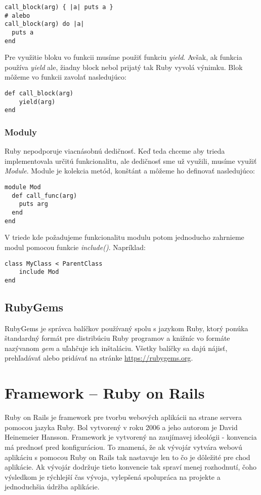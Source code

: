 \begin{verbatim}
call_block(arg) { |a| puts a }
# alebo
call_block(arg) do |a|
  puts a
end
\end{verbatim}

Pre využitie bloku vo funkcii musíme použiť funkciu \emph{yield}. Avšak, ak funkcia používa \emph{yield} ale, žiadny block nebol prijatý tak Ruby vyvolá výnimku. Blok môžeme vo funkcii zavolať nasledujúco:

\begin{verbatim}
def call_block(arg)
    yield(arg)
end
\end{verbatim}

\subsubsection{Moduly}

Ruby nepodporuje viacnásobnú dedičnosť. Keď teda chceme aby trieda implementovala určitú funkcionalitu, ale dedičnosť sme už využili, musíme využiť \emph{Module}. Module je kolekcia metód, konštánt a môžeme ho definovať nasledujúco:

\begin{verbatim}
module Mod
  def call_func(arg)
    puts arg
  end
end
\end{verbatim}

V triede kde požadujeme funkcionalitu modulu potom jednoducho zahrnieme modul pomocou funkcie \emph{include()}. Napríklad:

\begin{verbatim}
class MyClass < ParentClass
    include Mod
end
\end{verbatim}

\subsection{RubyGems}

RubyGems je správca balíčkov používaný spolu s jazykom Ruby, ktorý ponúka štandardný formát pre distribúciu Ruby programov a knižníc vo formáte nazývanom \emph{gem} a uľahčuje ich inštaláciu. Všetky balíčky sa dajú nájisť, prehľadávať alebo pridávať na stránke \url{https://rubygems.org}.

\section{Framework -- Ruby on Rails}

Ruby on Rails je framework pre tvorbu webových aplikácii na strane servera pomocou jazyka Ruby. Bol vytvorený v roku 2006 a jeho autorom je David Heinemeier Hansson. Framework je vytvorený na zaujímavej ideológii - konvencia má prednosť pred konfiguráciou. To znamená, že ak vývojár vytvára webovú aplikáciu s pomocou Ruby on Rails tak nastavuje len to čo je dôležité pre chod aplikácie.
Ak vývojár dodržuje tieto konvencie tak spraví menej rozhodnutí, čoho výsledkom je rýchlejší čas vývoja, vylepšená spolupráca na projekte a jednoduchšia údržba aplikácie.

